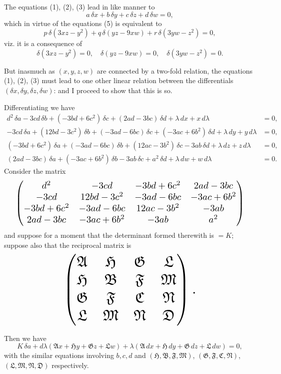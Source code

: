 \documentclass[11pt]{article}
\begin{document}
The equations (1), (2), (3) lead in like manner to
\[ a\,\delta x + b\,\delta y + c\,\delta z + d\,\delta w = 0, \]
which in virtue of the equations (5) is equivalent to
\[ p\,\delta(3xz - y^2) + q\,\delta(yz - 9xw) + r\,\delta(3yw - z^2) = 0, \]
viz. it is a consequence of
\[ \delta(3xz - y^2) = 0,\quad \delta(yz - 9xw) = 0,\quad \delta(3yw - z^2) = 0. \]

But inasmuch as $(x,y,z,w)$ are connected by a two-fold relation, the equations (1), (2), (3) must lead to one other linear relation between the differentials $(\delta x, \delta y, \delta z, \delta w)$: and I proceed to show that this is so.

Differentiating we have
\begin{align*}
d^2\,\delta a - 3cd\,\delta b + (-3bd + 6c^2)\,\delta c + (2ad - 3bc)\,\delta d + \lambda\,dx + x\,d\lambda &= 0,\\
-3cd\,\delta a + (12bd - 3c^2)\,\delta b + (-3ad - 6bc)\,\delta c + (-3ac + 6b^2)\,\delta d + \lambda\,dy + y\,d\lambda &= 0,\\
(-3bd + 6c^2)\,\delta a + (-3ad - 6bc)\,\delta b + (12ac - 3b^2)\,\delta c - 3ab\,\delta d + \lambda\,dz + z\,d\lambda &= 0,\\
(2ad - 3bc)\,\delta a + (-3ac + 6b^2)\,\delta b - 3ab\,\delta c + a^2\,\delta d + \lambda\,dw + w\,d\lambda &= 0.
\end{align*}
Consider the matrix
\[ \resizebox{0.95\textwidth}{!}{$\displaystyle \begin{pmatrix} d^2 & -3cd & -3bd + 6c^2 & 2ad - 3bc \\ -3cd & 12bd - 3c^2 & -3ad - 6bc & -3ac + 6b^2 \\ -3bd + 6c^2 & -3ad - 6bc & 12ac - 3b^2 & -3ab \\ 2ad - 3bc & -3ac + 6b^2 & -3ab & a^2 \end{pmatrix}$} \]
and suppose for a moment that the determinant formed therewith is $= K$; suppose also that the reciprocal matrix is
\[ \resizebox{0.55\textwidth}{!}{$\displaystyle \begin{pmatrix} \mathfrak{A} & \mathfrak{H} & \mathfrak{G} & \mathfrak{L} \\ \mathfrak{H} & \mathfrak{B} & \mathfrak{F} & \mathfrak{M} \\ \mathfrak{G} & \mathfrak{F} & \mathfrak{C} & \mathfrak{N} \\ \mathfrak{L} & \mathfrak{M} & \mathfrak{N} & \mathfrak{D} \end{pmatrix}.$} \]

Then we have
\[ K\,\delta a + d\lambda(\mathfrak{A}x + \mathfrak{H}y + \mathfrak{G}z + \mathfrak{L}w) + \lambda(\mathfrak{A}\,dx + \mathfrak{H}\,dy + \mathfrak{G}\,dz + \mathfrak{L}\,dw) = 0, \]
with the similar equations involving $b,c,d$ and $(\mathfrak{H},\mathfrak{B},\mathfrak{F},\mathfrak{M})$, $(\mathfrak{G},\mathfrak{F},\mathfrak{C},\mathfrak{N})$, $(\mathfrak{L},\mathfrak{M},\mathfrak{N},\mathfrak{D})$ respectively.
\end{document}
